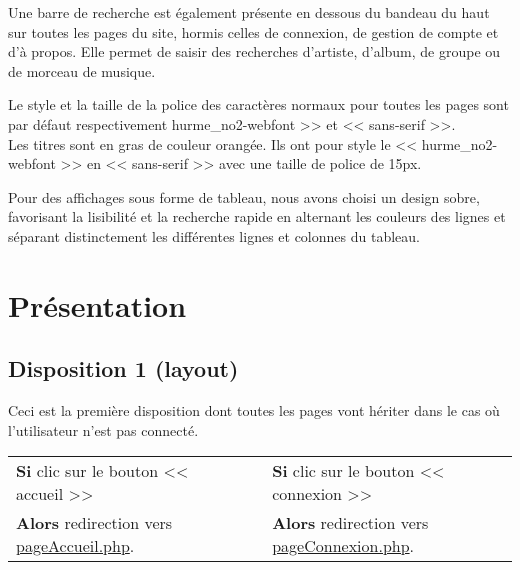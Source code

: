 \newpage

	\begin{paragraphe}
		Une barre de recherche est également présente en dessous du bandeau du haut sur toutes les pages du site, hormis celles de connexion, de gestion de compte et d'à propos.
		Elle permet de saisir des recherches d'artiste, d'album, de groupe ou de morceau de musique.
	\end{paragraphe}

	\begin{paragraphe}
		Le style et la taille de la police des caractères normaux pour toutes les pages sont par défaut respectivement \og hurme\_no2-webfont >> et << sans-serif >>.\\
		Les titres sont en gras de couleur orangée. Ils ont pour style le << hurme\_no2-webfont >> en << sans-serif >> avec une taille de police de 15px.
    \end{paragraphe}


    \begin{paragraphe}
       Pour des affichages sous forme de tableau, nous avons choisi un design sobre, favorisant la lisibilité et la recherche rapide en alternant les couleurs des lignes
       et séparant distinctement les différentes lignes et colonnes du tableau.
    \end{paragraphe}

\newpage

\section{Présentation}
	\subsection{Disposition 1 (layout)}

		\begin{paragraphe}
			Ceci est la première disposition dont toutes les pages vont hériter dans le cas où l'utilisateur n'est pas connecté.
		\end{paragraphe}

        \begin{center}
            \begin{tabular}{l c | c l}
                \textbf{Si} clic sur le bouton << accueil >> & & & \textbf{Si} clic sur le bouton << connexion >> \\
                \textbf{Alors} redirection vers \underline{pageAccueil.php}. & & & \textbf{Alors} redirection vers \underline{pageConnexion.php}.
            \end{tabular}
        \end{center}
        
